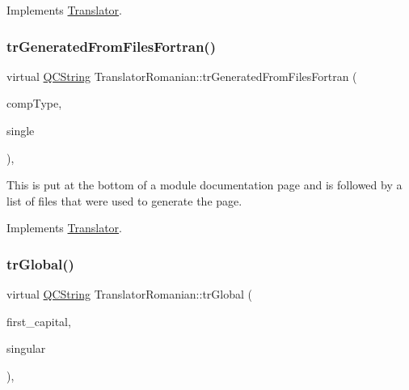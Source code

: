Implements \mbox{\hyperlink{class_translator}{Translator}}.

\mbox{\label{class_translator_romanian_ab0ccbfa73b3e708abc42b59221ede9bb}} 
\subsubsection{\texorpdfstring{trGeneratedFromFilesFortran()}{trGeneratedFromFilesFortran()}}
{\footnotesize\ttfamily virtual \mbox{\hyperlink{class_q_c_string}{Q\+C\+String}} Translator\+Romanian\+::tr\+Generated\+From\+Files\+Fortran (\begin{DoxyParamCaption}\item[{\mbox{\hyperlink{class_class_def_ae70cf86d35fe954a94c566fbcfc87939}{Class\+Def\+::\+Compound\+Type}}}]{comp\+Type,  }\item[{bool}]{single }\end{DoxyParamCaption})\hspace{0.3cm}{\ttfamily [inline]}, {\ttfamily [virtual]}}

This is put at the bottom of a module documentation page and is followed by a list of files that were used to generate the page. 

Implements \mbox{\hyperlink{class_translator}{Translator}}.

\mbox{\label{class_translator_romanian_ade98adfe7fc71f681030dd2821ec7b6c}} 
\subsubsection{\texorpdfstring{trGlobal()}{trGlobal()}}
{\footnotesize\ttfamily virtual \mbox{\hyperlink{class_q_c_string}{Q\+C\+String}} Translator\+Romanian\+::tr\+Global (\begin{DoxyParamCaption}\item[{bool}]{first\+\_\+capital,  }\item[{bool}]{singular }\end{DoxyParamCaption})\hspace{0.3cm}{\ttfamily [inline]}, {\ttfamily [virtual]}}

